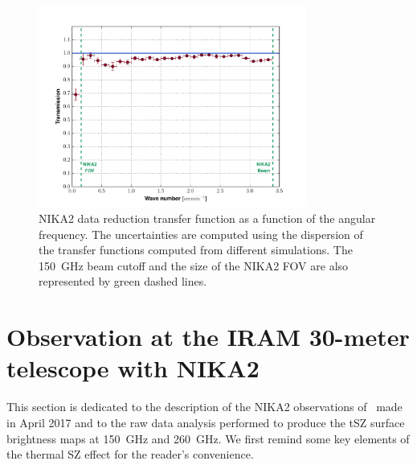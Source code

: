 \documentclass[traditabstract]{aa}
\begin{document}
\begin{figure}[h!]
\centering
\includegraphics[height=6.6cm]{TF_NIKA2_2mm.pdf}
\caption{{\footnotesize NIKA2 data reduction transfer function as a function of the angular frequency. The uncertainties are computed using the dispersion of the transfer functions computed from different simulations. The 150~GHz beam cutoff and the size of the NIKA2 FOV are also represented by green dashed lines.}}
\label{fig:TF_NIKA2_2mm}
\end{figure}

\section{Observation at the IRAM 30-meter telescope with NIKA2}\label{sec:Observations}

This section is dedicated to the description of the NIKA2 observations of \psz\ made in April 2017 and to the raw data analysis performed to produce the tSZ surface brightness maps at 150~GHz and 260~GHz. We first remind some key elements of the thermal SZ effect for the reader's convenience.

\end{document}
